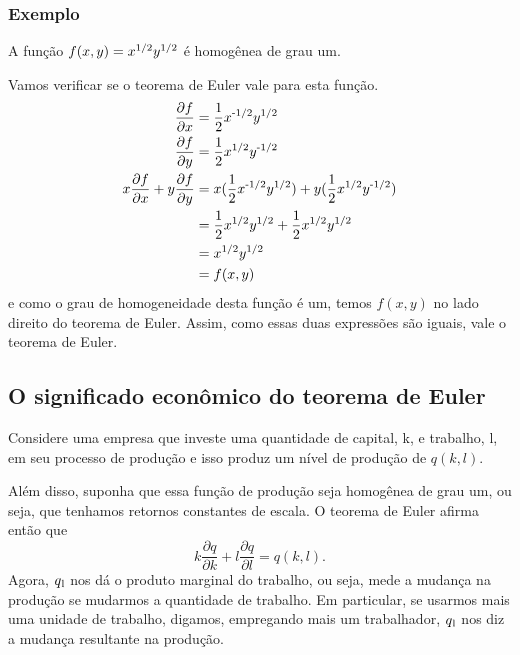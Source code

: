 \documentclass[a4paper]{article}
\begin{document}
\subsubsection*{Exemplo}
A função $f(x,y) = x\textsuperscript{1/2}y\textsuperscript{1/2}$ é homogênea de grau um.
\par Vamos verificar se o teorema de Euler vale para esta função.
\begin{equation}
    \begin{split}
        \frac{\partial f}{\partial x} &= \frac{1}{2}x\textsuperscript{-1/2}y\textsuperscript{1/2} \\
        \frac{\partial f}{\partial y} &= \frac{1}{2}x\textsuperscript{1/2}y\textsuperscript{-1/2} \\
        x\frac{\partial f}{\partial x} + y\frac{\partial f}{\partial y} &= x(\frac{1}{2}x\textsuperscript{-1/2}y\textsuperscript{1/2}) + y(\frac{1}{2}x\textsuperscript{1/2}y\textsuperscript{-1/2})\\
        &= \frac{1}{2}x\textsuperscript{1/2}y\textsuperscript{1/2} + \frac{1}{2}x\textsuperscript{1/2}y\textsuperscript{1/2} \\
        &= x\textsuperscript{1/2}y\textsuperscript{1/2} \\
        &= f(x,y) 
    \end{split}
\end{equation}
e como o grau de homogeneidade desta função é um, temos $f(x,y)$ no lado direito do teorema de Euler. Assim, como essas duas expressões são iguais, vale o teorema de Euler.
\subsection*{O significado econômico do teorema de Euler}
Considere uma empresa que investe uma quantidade de capital, k, e trabalho, l, em seu processo de produção e isso produz um nível de produção de $q(k,l)$.

\par Além disso, suponha que essa função de produção seja homogênea de grau um, ou seja, que tenhamos retornos constantes de escala. O teorema de Euler afirma então que
\begin{equation}
        k\frac{\partial q}{\partial k} + l\frac{\partial q}{\partial l} = q(k,l).
\end{equation}
Agora, $q\textsubscript{l}$ nos dá o produto marginal do trabalho, ou seja, mede a mudança na produção se mudarmos a quantidade de trabalho. Em particular, se usarmos mais uma unidade de trabalho, digamos, empregando mais um trabalhador, $q\textsubscript{l}$ nos diz a mudança resultante na produção.
\end{document}

